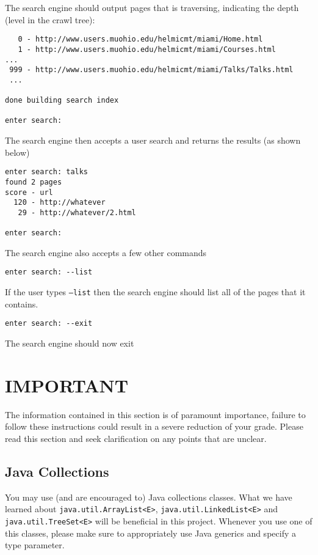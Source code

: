 \documentclass[10pt]{exam}
\begin{document}
\par
The search engine should output pages that is traversing, indicating the depth (level in the crawl tree):
\begin{verbatim}
   0 - http://www.users.muohio.edu/helmicmt/miami/Home.html 
   1 - http://www.users.muohio.edu/helmicmt/miami/Courses.html
...
 999 - http://www.users.muohio.edu/helmicmt/miami/Talks/Talks.html
 ... 

done building search index

enter search:
\end{verbatim}

\par
The search engine then accepts a user search and returns the results (as shown below)

\begin{verbatim}
enter search: talks
found 2 pages
score - url
  120 - http://whatever
   29 - http://whatever/2.html

enter search:	
\end{verbatim}

\par
The search engine also accepts a few other commands

\begin{verbatim}
enter search: --list
\end{verbatim}
If the user types {\tt --list} then the search engine should list all of the pages that it contains.

\begin{verbatim}
enter search: --exit
\end{verbatim}
The search engine should now exit


\section{IMPORTANT}
The information contained in this section is of paramount importance, failure to follow these instructions could result in a severe  reduction of your grade.   Please read this section and seek clarification on any points that are unclear.

\subsection{Java Collections}
You may use (and are encouraged to) Java collections classes.   What we have learned about {\tt java.util.ArrayList<E>}, {\tt java.util.LinkedList<E>} and {\tt java.util.TreeSet<E>} will be beneficial in this project.   Whenever you use one of this classes, please make sure to appropriately use Java generics and specify a type parameter.
\end{document}
